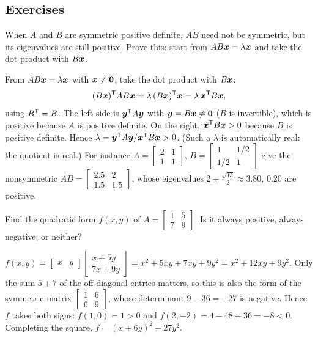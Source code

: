 \subsection{Exercises}

\begin{exercise}\label{exr:u31-AB}
When $A$ and $B$ are symmetric positive definite, $AB$ need not be symmetric, but its
eigenvalues are still positive. Prove this: start from $AB\boldsymbol{x}=\lambda\boldsymbol{x}$ and take the dot product
with $B\boldsymbol{x}$.
\end{exercise}
\begin{solution}
From $AB\boldsymbol{x}=\lambda\boldsymbol{x}$ with $\boldsymbol{x}\ne\boldsymbol{0}$, take the dot product with $B\boldsymbol{x}$:
\[
  (B\boldsymbol{x})^{\mathsf{T}} AB\boldsymbol{x}=\lambda\,(B\boldsymbol{x})^{\mathsf{T}}\boldsymbol{x}=\lambda\,\boldsymbol{x}^{\mathsf{T}} B\boldsymbol{x},
\]
using $B^{\mathsf{T}}=B$. The left side is $\boldsymbol{y}^{\mathsf{T}} A\boldsymbol{y}$ with $\boldsymbol{y}=B\boldsymbol{x}\ne\boldsymbol{0}$ ($B$ is invertible), which is
positive because $A$ is positive definite. On the right, $\boldsymbol{x}^{\mathsf{T}} B\boldsymbol{x}>0$ because $B$ is positive
definite. Hence $\lambda=\boldsymbol{y}^{\mathsf{T}} A\boldsymbol{y}/\boldsymbol{x}^{\mathsf{T}} B\boldsymbol{x}>0$. (Such a $\lambda$ is automatically real: the
quotient is real.) For instance $A=\left[\begin{smallmatrix}2&1\\1&1\end{smallmatrix}\right]$,
$B=\left[\begin{smallmatrix}1&1/2\\1/2&1\end{smallmatrix}\right]$ give the nonsymmetric
$AB=\left[\begin{smallmatrix}2.5&2\\1.5&1.5\end{smallmatrix}\right]$, whose eigenvalues
$2\pm\frac{\sqrt{13}}{2}\approx3.80,\,0.20$ are positive.
\end{solution}

\begin{exercise}\label{exr:u31-form}
Find the quadratic form $f(x,y)$ of $A=\left[\begin{smallmatrix}1&5\\7&9\end{smallmatrix}\right]$. Is it
always positive, always negative, or neither?
\end{exercise}
\begin{solution}
$f(x,y)=\begin{bmatrix}x&y\end{bmatrix}\begin{bmatrix}x+5y\\7x+9y\end{bmatrix}=x^2+5xy+7xy+9y^2=x^2+12xy+9y^2$.
Only the sum $5+7$ of the off-diagonal entries matters, so this is also the form of the
symmetric matrix $\left[\begin{smallmatrix}1&6\\6&9\end{smallmatrix}\right]$, whose determinant
$9-36=-27$ is negative. Hence $f$ takes both signs: $f(1,0)=1>0$ and $f(2,-2)=4-48+36=-8<0$.
Completing the square, $f=(x+6y)^2-27y^2$.
\end{solution}

